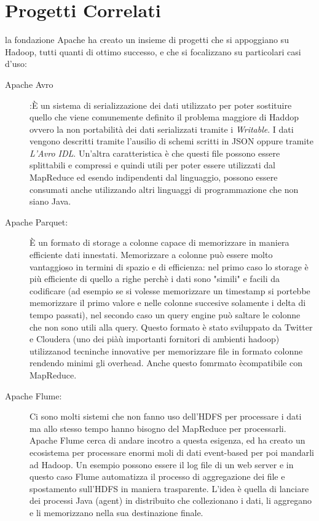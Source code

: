 \section{Progetti Correlati}
la fondazione Apache ha creato un insieme di progetti che si appoggiano su Hadoop, tutti quanti di ottimo successo, e che si focalizzano su particolari casi d'uso:
\begin{description}
  \item[Apache Avro]:È un sistema di serializzazione dei dati utilizzato per poter sostituire quello che viene comunemente definito il problema maggiore di Haddop ovvero la non portabilità dei dati serializzati tramite i \textit{Writable}. I dati vengono descritti tramite l'ausilio di schemi scritti in JSON oppure tramite \textit{L'Avro IDL}. Un'altra caratteristica è che questi file possono essere splittabili e compressi e quindi utili per poter essere utilizzati dal MapReduce ed esendo indipendenti dal linguaggio, possono essere consumati anche utilizzando altri linguaggi di programmazione che non siano Java.
  \item[Apache Parquet:] È un formato di storage a colonne capace di memorizzare in maniera efficiente dati innestati. Memorizzare a colonne può essere molto vantaggioso in termini di spazio e di efficienza: nel primo caso lo storage è più efficiente di quello a righe perchè i dati sono "simili" e facili da codificare (ad esempio se si volesse memorizzare un timestamp si portebbe memorizzare il primo valore e nelle colonne succesive solamente i delta di tempo passati), nel secondo caso un query engine può saltare le colonne che non sono utili alla query. Questo formato è stato sviluppato da Twitter e Cloudera (uno dei piàù importanti fornitori di ambienti hadoop) utilizzanod tecninche innovative per memorizzare file in formato colonne rendendo minimi gli overhead. Anche questo fomrmato ècompatibile con MapReduce.
  \item[Apache Flume:] Ci sono molti sistemi che non fanno uso dell'HDFS per processare i dati ma allo stesso tempo hanno bisogno del MapReduce per processarli. Apache Flume cerca di andare incotro a questa esigenza, ed ha creato un ecosistema per processare enormi moli di dati event-based per poi mandarli ad Hadoop. Un esempio possono essere il log file di un web server e in questo caso Flume automatizza il processo di aggregazione dei file e spostamento sull'HDFS in maniera trasparente. L'idea è quella di lanciare dei processi Java (agent) in distribuito che collezionano i dati, li aggregano e li memorizzano nella sua destinazione finale.

\end{description}
